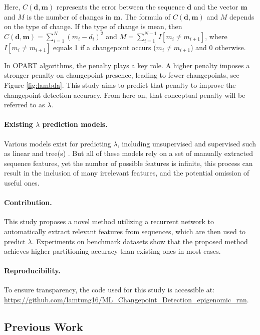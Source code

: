 \documentclass[12pt]{article}
\begin{document}
\noindent Here, $C(\textbf{d}, \textbf{m})$ represents the error between the sequence $\textbf{d}$ and the vector $\textbf{m}$ and $M$ is the number of changes in $\textbf{m}$.
The formula of $C(\textbf{d}, \textbf{m})$ and $M$ depends on the type of change.
If the type of change is mean, then $C(\textbf{d}, \textbf{m}) = \sum_{i=1}^{N}(m_i-d_i)^2$ and $M=\sum_{i=1}^{N-1} I[m_i \neq m_{i+1}]$, where $I[m_i \neq m_{i+1}]$ equals 1 if a changepoint occurs ($m_i \neq m_{i+1}$) and 0 otherwise.
\newline

In OPART algorithms, the penalty plays a key role.
A higher penalty imposes a stronger penalty on changepoint presence, leading to fewer changepoints, see Figure \ref{fig:lambda}.
This study aims to predict that penalty to improve the changepoint detection accuracy. 
From here on, that conceptual penalty will be referred to as $\lambda$.

\paragraph{Existing $\lambda$ prediction models.}
Various models exist for predicting $\lambda$, including unsupervised \citep{bic, aic, lavielle05} and supervised such as linear \citep{rigaill:13} and tree(s) \citep{mmit, aft_xgboost}.
But all of these models rely on a set of manually extracted sequence features, yet the number of possible features is infinite, this process can result in the inclusion of many irrelevant features, and the potential omission of useful ones.

\paragraph{Contribution.} This study proposes a novel method utilizing a recurrent network to automatically extract relevant features from sequences, which are then used to predict $\lambda$.
Experiments on benchmark datasets show that the proposed method achieves higher partitioning accuracy than existing ones in most cases.

\paragraph{Reproducibility.} To ensure transparency, the code used for this study is accessible at: \url{https://github.com/lamtung16/ML_Changepoint_Detection_epigenomic_rnn}.

\subsection{Previous Work}
\end{document}
